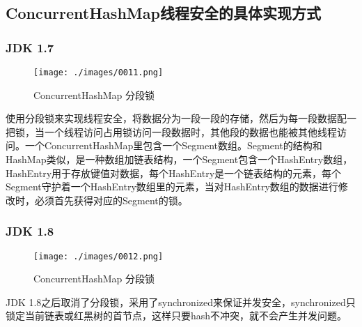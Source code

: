 \documentclass[main.tex]{subfiles}
\begin{document}
\subsection{ConcurrentHashMap线程安全的具体实现方式}
\subsubsection{JDK 1.7}
\begin{figure}[H]
    \centering
    \texttt{[image: ./images/0011.png]}
    \caption{ConcurrentHashMap 分段锁}
\end{figure}
使用分段锁来实现线程安全，将数据分为一段一段的存储，然后为每一段数据配一把锁，当一个线程访问占用锁访问一段数据时，其他段的数据也能被其他线程访问。一个ConcurrentHashMap里包含一个Segment数组。Segment的结构和HashMap类似，是一种数组加链表结构，一个Segment包含一个HashEntry数组，HashEntry用于存放键值对数据，每个HashEntry是一个链表结构的元素，每个Segment守护着一个HashEntry数组里的元素，当对HashEntry数组的数据进行修改时，必须首先获得对应的Segment的锁。
\subsubsection{JDK 1.8}
\begin{figure}[H]
    \centering
    \texttt{[image: ./images/0012.png]}
    \caption{ConcurrentHashMap 分段锁}
\end{figure}
JDK 1.8之后取消了分段锁，采用了synchronized来保证并发安全，synchronized只锁定当前链表或红黑树的首节点，这样只要hash不冲突，就不会产生并发问题。
\end{document}

